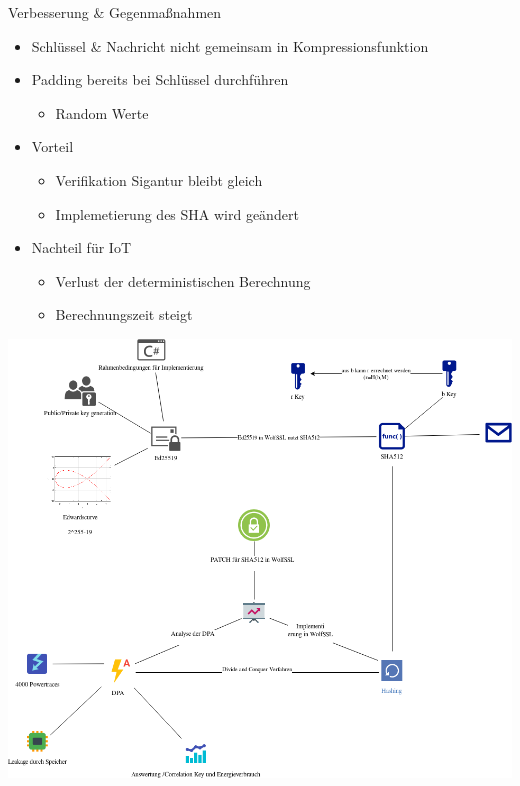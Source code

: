 \documentclass[
  9pt,
  ignorenonframetext,
  aspectratio=169,
]{beamer}
\providecommand{\tightlist}{%
  \setlength{\itemsep}{0pt}\setlength{\parskip}{0pt}}
\begin{document}
\begin{frame}{Verbesserung \& Gegenmaßnahmen}
\protect\hypertarget{verbesserung-gegenmauxdfnahmen}{}
\begin{itemize}
\item
  Schlüssel \& Nachricht nicht gemeinsam in Kompressionsfunktion
\item
  Padding bereits bei Schlüssel durchführen

  \begin{itemize}
  \tightlist
  \item
    Random Werte
  \end{itemize}
\item
  Vorteil

  \begin{itemize}
  \tightlist
  \item
    Verifikation Sigantur bleibt gleich
  \item
    Implemetierung des SHA wird geändert
  \end{itemize}
\item
  Nachteil für IoT

  \begin{itemize}
  \tightlist
  \item
    Verlust der deterministischen Berechnung
  \item
    Berechnungszeit steigt
  \end{itemize}
\end{itemize}
\end{frame}

\begin{frame}{}
\protect\hypertarget{section-8}{}
\includegraphics{Abbildungen/ITSEC(1).png}
\end{frame}
\end{document}
